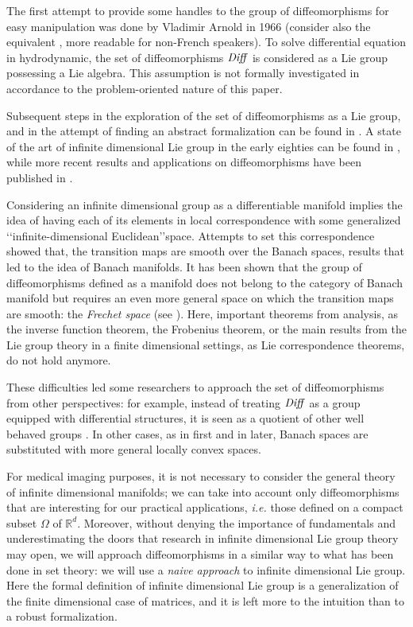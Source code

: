 The first attempt to provide some handles to the group of diffeomorphisms for easy manipulation was done by Vladimir Arnold in 1966 \cite{arnold1966geometrie} (consider also the equivalent \cite{arnold1998topological}, more readable for non-French speakers). To solve differential equation in hydrodynamic, the set of diffeomorphisms $\text{\emph{Diff}}$ is considered as a Lie group possessing a Lie algebra. This assumption is not formally investigated in accordance to the problem-oriented nature of this paper. 

Subsequent steps in the exploration of the set of diffeomorphisms as a Lie group, and in the attempt of finding an abstract formalization can be found in \cite{marsden1970hamiltonian, ebin1970groups, omori1970group, michor1980manifolds, leslie1983lie}. A state of the art of  infinite dimensional Lie group in the early eighties can be found in \cite{Milnor:84:remarks}, while more recent results and applications on diffeomorphisms have been published in \cite{ovsienko1992integrals, bauer2010sobolev, schmid2010infinite,  bauer2011geodesic}.

Considering an infinite dimensional group as a differentiable manifold implies the idea of having each of its elements in local correspondence with some generalized \lq\lq infinite-dimensional Euclidean\rq\rq\phantom{z}space. Attempts to set this correspondence showed that, the transition maps are smooth over the Banach spaces, results that led to the idea of Banach manifolds. It has been shown that the group of diffeomorphisms defined as a manifold does not belong to the category of Banach manifold but requires an even more general space on which the transition maps are smooth: the \emph{Frechet space} (see \cite{khesin2008geometry}). Here, important theorems from analysis, as the inverse function theorem, the Frobenius theorem, or the main results from the Lie group theory in a finite dimensional settings, as Lie correspondence theorems, do not hold anymore. 

These difficulties led some researchers to approach the set of diffeomorphisms from other perspectives: 
for example, instead of treating $\text{\emph{Diff}}$ as a group equipped with differential structures, it is seen as a quotient of other well behaved groups \cite{wojtynski1994one}. In other cases, as in \cite{marsden1970hamiltonian} first and in \cite{milnor1984remarks} later, Banach spaces are substituted with more general locally convex spaces.

For medical imaging purposes, it is not necessary to consider the general theory of infinite dimensional manifolds; we can take into account only diffeomorphisms that are interesting for our practical applications, \emph{i.e.} those defined on a compact subset $\Omega$ of $\mathbb{R}^d$. Moreover, without denying the importance of fundamentals and underestimating the doors that research in infinite dimensional Lie group theory may open, we will approach diffeomorphisms in a similar way to what has been done in set theory: we will use a \emph{naive approach} to infinite dimensional Lie group. 
Here the formal definition of infinite dimensional Lie group is a generalization of the finite dimensional case of matrices, and it is left more to the intuition than to a robust formalization. 


